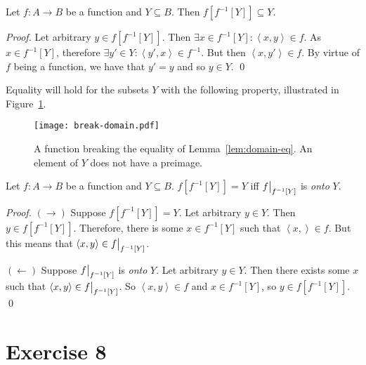 \documentclass[11pt]{llncs}
\begin{document}
\begin{lemma}
  Let $f: A \longrightarrow B$ be a function and $Y \subseteq B$. Then
  $f[f^{-1}[Y]] \subseteq Y$.
\end{lemma}
\begin{proof}
  Let arbitrary $y \in f[f^{-1}[Y]]$. Then
  $\exists x \in f^{-1}[Y]: \left<x, y\right> \in f$. As
  $x \in f^{-1}[Y]$, therefore $\exists y' \in Y: \left<y', x\right> \in
  f^{-1}$. But then $\left<x, y'\right> \in f$. By virtue of $f$ being a
  function, we have that $y' = y$ and so $y \in Y$.
  \qed
\end{proof}

Equality will hold for the subsets $Y$ with the following property, illustrated
in Figure~\ref{fig:break-domain}.

\begin{figure}[H]\label{fig:break-domain}
    \caption{A function breaking the equality of Lemma~\ref{lem:domain-eq}.
             An element of $Y$ does not have a preimage.}
    \centering
    \texttt{[image: break-domain.pdf]}
\end{figure}

\begin{lemma}\label{lem:domain-eq}
  Let $f: A \longrightarrow B$ be a function and $Y \subseteq B$.
  $f[f^{-1}[Y]] = Y$
  iff
  $\restr{f}{f^{-1}[Y]}$ is \emph{onto} $Y$.
\end{lemma}
\begin{proof}
  \item $(\rightarrow)$
  Suppose $f[f^{-1}[Y]] = Y$. Let arbitrary $y \in Y$. Then
  $y \in f[f^{-1}[Y]]$. Therefore, there is some $x \in f^{-1}[Y]$ such that
  $\left<x, \right> \in f$. But this means that
  $\left<x, y\right> \in \restr{f}{f^{-1}[Y]}$.
  \item $(\leftarrow)$
  Suppose $\restr{f}{f^{-1}[Y]}$ is \emph{onto} $Y$.
  Let arbitrary $y \in Y$. Then there exists some $x$ such that
  $\left<x, y\right> \in \restr{f}{f^{-1}[Y]}$. So $\left<x, y\right> \in f$
  and $x \in f^{-1}[Y]$, so $y \in f[f^{-1}[Y]]$.
  \qed
\end{proof}

\section*{Exercise 8}
\end{document}
